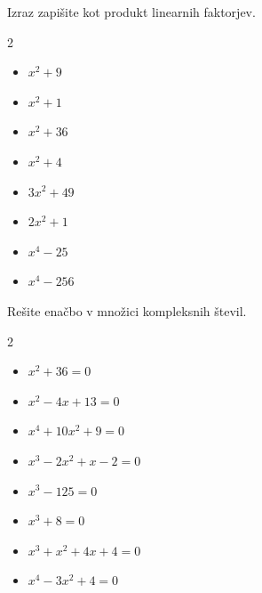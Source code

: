      
                
            \begin{naloga}
                Izraz zapišite kot produkt linearnih faktorjev.

                \begin{multicols}{2}
                    
                \begin{itemize}
                        \item $ x^2+9 $ 
                        \item $ x^2+1 $ 
                        \item $ x^2+36 $ 
                        \item $ x^2+4 $ 
                        \item $ 3x^2+49 $ 
                        \item $ 2x^2+1 $ 
                        \item $ x^4-25 $ 
                        \item $ x^4-256 $ 
                    \end{itemize}
                \end{multicols}
            \end{naloga}

       

            \begin{naloga}
                Rešite enačbo v množici kompleksnih števil.

                \begin{multicols}{2}
                    
                \begin{itemize}
                        \item $ x^2+36=0 $ 
                        \item $ x^2-4x+13=0 $ 
                        \item $ x^4+10x^2+9=0 $ 
                        \item $ x^3-2x^2+x-2=0 $ 
                        \item $ x^3-125=0 $ 
                        \item $ x^3+8=0 $ 
                        \item $ x^3+x^2+4x+4=0 $ 
                        \item $ x^4-3x^2+4=0 $ 
                    \end{itemize}
                \end{multicols}
            \end{naloga}

